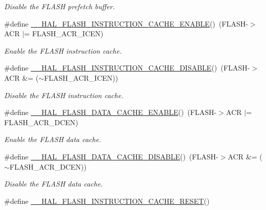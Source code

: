 \begin{DoxyCompactItemize}
\begin{DoxyCompactList}\small\item\em Disable the F\+L\+A\+SH prefetch buffer. \end{DoxyCompactList}\item 
\#define \mbox{\hyperlink{group___f_l_a_s_h___exported___macros_gaddb00cd85fe48a524fad33c7fe63e038}{\+\_\+\+\_\+\+H\+A\+L\+\_\+\+F\+L\+A\+S\+H\+\_\+\+I\+N\+S\+T\+R\+U\+C\+T\+I\+O\+N\+\_\+\+C\+A\+C\+H\+E\+\_\+\+E\+N\+A\+B\+LE}}()~(F\+L\+A\+SH-\/$>$A\+CR $\vert$= F\+L\+A\+S\+H\+\_\+\+A\+C\+R\+\_\+\+I\+C\+EN)
\begin{DoxyCompactList}\small\item\em Enable the F\+L\+A\+SH instruction cache. \end{DoxyCompactList}\item 
\#define \mbox{\hyperlink{group___f_l_a_s_h___exported___macros_ga01bf00ed6e7c0e74ed0931f3b8b033ed}{\+\_\+\+\_\+\+H\+A\+L\+\_\+\+F\+L\+A\+S\+H\+\_\+\+I\+N\+S\+T\+R\+U\+C\+T\+I\+O\+N\+\_\+\+C\+A\+C\+H\+E\+\_\+\+D\+I\+S\+A\+B\+LE}}()~(F\+L\+A\+SH-\/$>$A\+CR \&= ($\sim$F\+L\+A\+S\+H\+\_\+\+A\+C\+R\+\_\+\+I\+C\+EN))
\begin{DoxyCompactList}\small\item\em Disable the F\+L\+A\+SH instruction cache. \end{DoxyCompactList}\item 
\#define \mbox{\hyperlink{group___f_l_a_s_h___exported___macros_gad94db5b43a234c8dd3dde8fcf0e4cedd}{\+\_\+\+\_\+\+H\+A\+L\+\_\+\+F\+L\+A\+S\+H\+\_\+\+D\+A\+T\+A\+\_\+\+C\+A\+C\+H\+E\+\_\+\+E\+N\+A\+B\+LE}}()~(F\+L\+A\+SH-\/$>$A\+CR $\vert$= F\+L\+A\+S\+H\+\_\+\+A\+C\+R\+\_\+\+D\+C\+EN)
\begin{DoxyCompactList}\small\item\em Enable the F\+L\+A\+SH data cache. \end{DoxyCompactList}\item 
\#define \mbox{\hyperlink{group___f_l_a_s_h___exported___macros_ga247f85a1fcc780be21f9fc2f1d29ee7e}{\+\_\+\+\_\+\+H\+A\+L\+\_\+\+F\+L\+A\+S\+H\+\_\+\+D\+A\+T\+A\+\_\+\+C\+A\+C\+H\+E\+\_\+\+D\+I\+S\+A\+B\+LE}}()~(F\+L\+A\+SH-\/$>$A\+CR \&= ($\sim$F\+L\+A\+S\+H\+\_\+\+A\+C\+R\+\_\+\+D\+C\+EN))
\begin{DoxyCompactList}\small\item\em Disable the F\+L\+A\+SH data cache. \end{DoxyCompactList}\item 
\#define \mbox{\hyperlink{group___f_l_a_s_h___exported___macros_ga69dff538775ee23738d54eef4a259b66}{\+\_\+\+\_\+\+H\+A\+L\+\_\+\+F\+L\+A\+S\+H\+\_\+\+I\+N\+S\+T\+R\+U\+C\+T\+I\+O\+N\+\_\+\+C\+A\+C\+H\+E\+\_\+\+R\+E\+S\+ET}}()

\end{DoxyCompactItemize}
